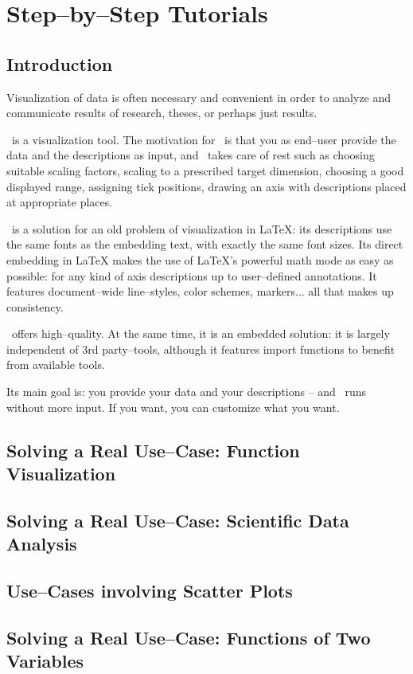 
\chapter{Step--by--Step Tutorials}
{%
%

\section{Introduction}
Visualization of data is often necessary and convenient in order to analyze and communicate results of research, theses, or perhaps just results.

\PGFPlots\ is a visualization tool. The motivation for \PGFPlots\ is that you as end--user provide the data and the descriptions as input, and \PGFPlots\ takes care of rest such as choosing suitable scaling factors, scaling to a prescribed target dimension, choosing a good displayed range, assigning tick positions, drawing an axis with descriptions placed at appropriate places.

\PGFPlots\ is a solution for an old problem of visualization in LaTeX: its descriptions use the same fonts as the embedding text, with exactly the same font sizes. Its direct embedding in LaTeX makes the use of LaTeX's powerful math mode as easy as possible: for any kind of axis descriptions up to user--defined annotations. It features document--wide line--styles, color schemes, markers... all that makes up consistency.

\PGFPlots\ offers high--quality. At the same time, it is an embedded solution: it is largely independent of 3rd party--tools, although it features import functions to benefit from available tools.

Its main goal is: you provide your data and your descriptions -- and \PGFPlots\ runs without more input. If you want, you can customize what you want.

\section{Solving a Real Use--Case: Function Visualization}



\section{Solving a Real Use--Case: Scientific Data Analysis}



\section{Use--Cases involving Scatter Plots}



\section{Solving a Real Use--Case: Functions of Two Variables}


}%
\endinput
